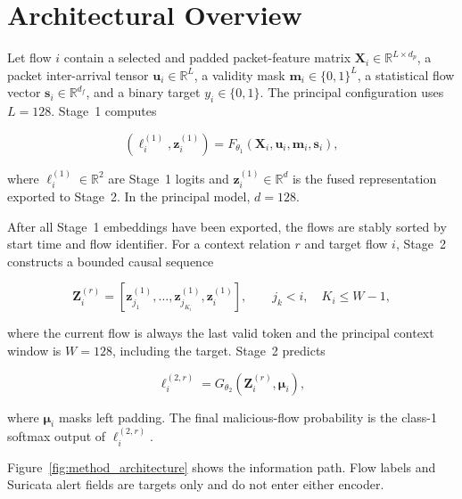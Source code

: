 \documentclass[11pt,fleqn]{report}
\begin{document}
\section{Architectural Overview}
\label{subsec:method_architecture}

Let flow $i$ contain a selected and padded packet-feature matrix
$\mathbf{X}_i\in\mathbb{R}^{L\times d_p}$, a packet inter-arrival tensor
$\mathbf{u}_i\in\mathbb{R}^{L}$, a validity mask
$\mathbf{m}_i\in\{0,1\}^{L}$, a statistical flow vector
$\mathbf{s}_i\in\mathbb{R}^{d_f}$, and a binary target
$y_i\in\{0,1\}$. The principal configuration uses $L=128$. Stage~1 computes

\begin{equation}
    \left(\boldsymbol{\ell}^{(1)}_i,\mathbf{z}^{(1)}_i\right)
    =F_{\theta_1}
    \left(
        \mathbf{X}_i,\mathbf{u}_i,\mathbf{m}_i,\mathbf{s}_i
    \right),
    \label{eq:method_stage1_mapping}
\end{equation}

where $\boldsymbol{\ell}^{(1)}_i\in\mathbb{R}^{2}$ are Stage~1 logits and $\mathbf{z}^{(1)}_i\in\mathbb{R}^{d}$ is the fused representation exported to Stage~2. In the principal model, $d=128$.

After all Stage~1 embeddings have been exported, the flows are stably sorted by start time and flow identifier. For a context relation $r$ and target flow $i$, Stage~2 constructs a bounded causal sequence

\begin{equation}
    \mathbf{Z}^{(r)}_i=
    \left[
        \mathbf{z}^{(1)}_{j_1},\ldots,
        \mathbf{z}^{(1)}_{j_{K_i}},
        \mathbf{z}^{(1)}_i
    \right],
    \qquad j_k<i,\quad K_i\leq W-1,
    \label{eq:method_stage2_input}
\end{equation}

where the current flow is always the last valid token and the principal context window is $W=128$, including the target. Stage~2 predicts

\begin{equation}
    \boldsymbol{\ell}^{(2,r)}_i
    =G_{\theta_2}
    \left(\mathbf{Z}^{(r)}_i,\boldsymbol{\mu}_i\right),
    \label{eq:method_stage2_mapping}
\end{equation}

where $\boldsymbol{\mu}_i$ masks left padding. The final malicious-flow probability is the class-1 softmax output of $\boldsymbol{\ell}^{(2,r)}_i$.

Figure~\ref{fig:method_architecture} shows the information path. Flow labels and Suricata alert fields are targets only and do not enter either encoder.
\end{document}
